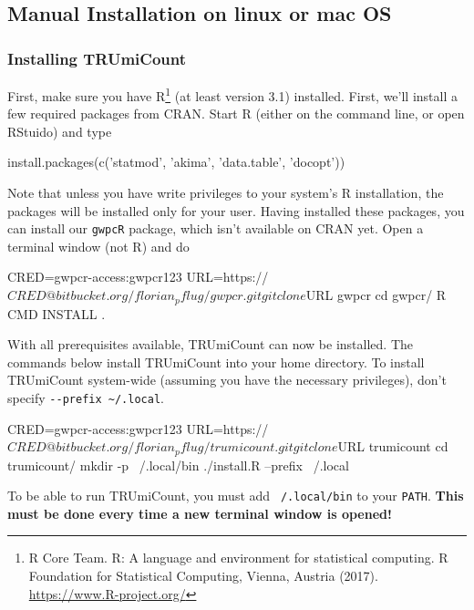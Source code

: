 \documentclass[10pt]{article}
\newcommand{\ddarg}[1]{\texttt{-{}-#1}}
\begin{document}
\pagebreak
\subsection{Manual Installation on linux or mac OS}

\subsubsection*{Installing TRUmiCount}

First, make sure you have R\footnote{R Core Team. R: A language and environment for statistical
  computing. R Foundation for Statistical Computing, Vienna, Austria (2017). \url{https://www.R-project.org/}} (at least version 3.1) installed. First, we'll install a few required packages from CRAN. Start R (either on the command line, or open RStuido) and type

\begin{Rcode}
install.packages(c('statmod', 'akima', 'data.table', 'docopt'))
\end{Rcode}

Note that unless you have write privileges to your system's R installation, the packages will be installed only for your user. Having installed these packages, you can install our \texttt{gwpcR} package, which isn't available on CRAN yet. Open a terminal window (not R) and do
  
\begin{shellcode}
CRED=gwpcr-access:gwpcr123
URL=https://$CRED@bitbucket.org/florian_pflug/gwpcr.git
git clone $URL gwpcr
cd gwpcr/
R CMD INSTALL .
\end{shellcode}

With all prerequisites available, TRUmiCount can now be installed. The commands below install TRUmiCount into your home directory. To install TRUmiCount system-wide (assuming you have the necessary privileges), don't specify \ddarg{prefix \textasciitilde/.local}.

\begin{shellcode}
CRED=gwpcr-access:gwpcr123
URL=https://$CRED@bitbucket.org/florian_pflug/trumicount.git
git clone $URL trumicount
cd trumicount/
mkdir -p ~/.local/bin
./install.R --prefix ~/.local
\end{shellcode}

To be able to run TRUmiCount, you must add \texttt{~/.local/bin} to your \texttt{PATH}. \textbf{This must be done every time a new terminal window is opened!}

\end{document}
